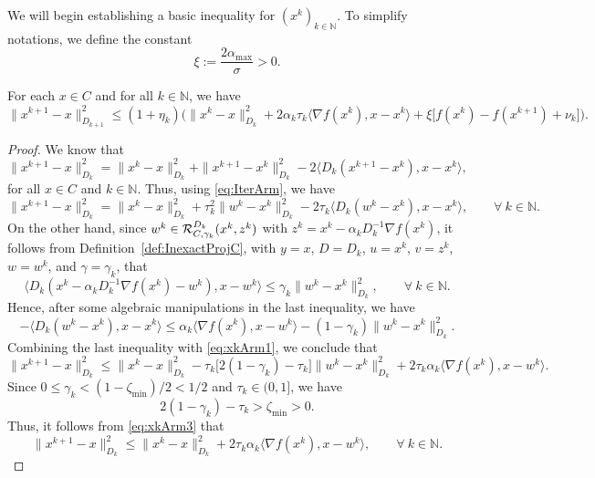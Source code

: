 We will begin establishing  a basic inequality for    $(x^k)_{k\in\mathbb{N}}$.  To simplify  notations, we define the constant
\begin{equation} \label{eq:eta}
	\xi := \dfrac{2 \alpha_{\max}}{\sigma} > 0.
\end{equation}
\begin{lemma}\label{Le:xkArm}
	For each  $x\in C$ and for all $k \in \mathbb{N}$, we have
	\begin{equation}\label{eq:xkArm}
		\|x^{k+1}-x\|_{D_{k+1}}^2 \leq (1+\eta_k)\Big(\|x^k-x\|_{D_k}^2 + 2\alpha_k\tau_k \big\langle \nabla f(x^k), x-x^k\big\rangle + \xi \big[f(x^k) - f(x^{k+1})+ \nu_k \big]\Big).
	\end{equation}
\end{lemma}
\begin{proof}
	We know that $$\|x^{k+1}-x\|_{D_k}^2 = \|x^k-x\|_{D_k}^2 + \|x^{k+1}-x^k\|_{D_k}^2 - 2 \langle {D_k} ( x^{k+1}-x^k), x-x^k \rangle,$$ for all $x \in C$ and $k \in \mathbb{N}$. Thus, using \eqref{eq:IterArm}, we have
	\begin{equation}\label{eq:xkArm1}
		\|x^{k+1}-x\|_{D_k}^2 = \|x^k-x\|_{D_k}^2 + \tau_k^2\|w^k - x^{k}\|_{D_k}^2 - 2 \tau_k \big\langle {D_k}(w^k - x^{k}), x-x^k \big\rangle, \qquad \forall ~k \in \mathbb{N}.
	\end{equation}
	On the other hand, since  $w^k \in{\cal R}_{C,\gamma_k}^{D_k}(x^{k}, z^k)$ with $z^k = x^{k}-\alpha_k D_k^{-1} \nabla f(x^{k})$, it follows from Definition~\ref{def:InexactProjC},  with $y=x$, $D = D_k$, $u = x^k$, $v = z^k$, $w = w^k$,  and $\gamma = \gamma_k$,  that
	$$
		\big\langle D_k(x^k-\alpha_kD_k^{-1}\nabla f(x^k)-w^k), x-w^k\big\rangle \leq \gamma_k \|w^k - x^{k}\|_{D_k}^2, \qquad \forall ~k \in \mathbb{N}.
	$$
	Hence,  after some algebraic manipulations in the last inequality, we have
	$$
		-\big\langle D_k(w^k-x^k), x-x^k\big\rangle \leq \alpha_k \big\langle \nabla f(x^k), x-w^k \big\rangle - (1-\gamma_k) \|w^k-x^k\|_{D_k}^2.
	$$
	Combining the last inequality with \eqref{eq:xkArm1},  we conclude  that
	\begin{equation} \label{eq:xkArm3}
		\|x^{k+1}-x\|_{D_k}^2 \leq \|x^k-x\|_{D_k}^2 - \tau_k \big[2(1-\gamma_k) - \tau_k \big] \|w^k-x^k\|_{D_k}^2 + 2\tau_k\alpha_k \big\langle \nabla f(x^k), x-w^k\big\rangle.
	\end{equation}
	Since $0 \leq \gamma_k <(1-{\zeta_{\min}})/2 < 1/2$ and $\tau_k \in (0, 1]$, we have
	$$
		2(1-\gamma_k) - \tau_k > {\zeta_{\min}} > 0.
	$$
	Thus, it follows from \eqref{eq:xkArm3} that
	$$
		\|x^{k+1}-x\|_{D_k}^2 \leq \|x^k-x\|_{D_k}^2 + 2\tau_k\alpha_k \big\langle \nabla f(x^k), x-w^k\big\rangle, \qquad \forall ~k \in \mathbb{N}.
$$
\end{proof}
